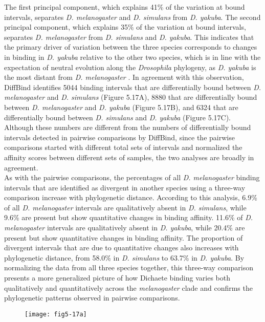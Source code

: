 The first principal component, which explains 41\% of the variation at bound intervals, separates \emph{D. melanogaster} and \emph{D. simulans} from \emph{D. yakuba}. The second principal component, which explains 35\% of the variation at bound intervals, separates \emph{D. melanogaster} from \emph{D. simulans} and \emph{D. yakuba}. This indicates that the primary driver of variation between the three species corresponds to changes in binding in \emph{D. yakuba} relative to the other two species, which is in line with the expectation of neutral evolution along the \emph{Drosophila} phylogeny, as \emph{D. yakuba} is the most distant from \emph{D. melanogaster} \citep{russo_molecular_1995}. In agreement with this observation, DiffBind identifies 5044 binding intervals that are differentially bound between \emph{D. melanogaster} and \emph{D. simulans} (Figure 5.17A), 8880 that are differentially bound between \emph{D. melanogaster} and \emph{D. yakuba} (Figure 5.17B), and 6324 that are differentially bound between \emph{D. simulans} and \emph{D. yakuba} (Figure 5.17C). Although these numbers are different from the numbers of differentially bound intervals detected in pairwise comparisons by DiffBind, since the pairwise comparisons started with different total sets of intervals and normalized the affinity scores between different sets of samples, the two analyses are broadly in agreement.\\

As with the pairwise comparisons, the percentages of all \emph{D. melanogaster} binding intervals that are identified as divergent in another species using a three-way comparison increase with phylogenetic distance. According to this analysis, 6.9\% of all \emph{D. melanogaster} intervals are qualitatively absent in \emph{D. simulans}, while 9.6\% are present but show quantitative changes in binding affinity. 11.6\% of \emph{D. melanogaster} intervals are qualitatively absent in \emph{D. yakuba}, while 20.4\% are present but show quantitative changes in binding affinity. The proportion of divergent intervals that are due to quantitative changes also increases with phylogenetic distance, from 58.0\% in \emph{D. simulans} to 63.7\% in \emph{D. yakuba}. By normalizing the data from all three species together, this three-way comparison presents a more generalized picture of how Dichaete binding varies both qualitatively and quantitatively across the \emph{melanogaster} clade and confirms the phylogenetic patterns observed in pairwise comparisons.


\begin{figure}[H]
\centering
\texttt{[image: fig5-17a]}
\label{Figure 5.17}
\end{figure}


